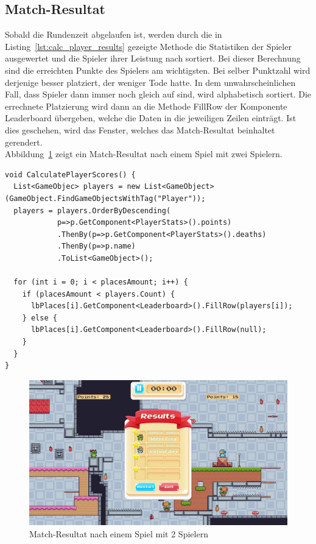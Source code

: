 \subsection{Match-Resultat}
Sobald die Rundenzeit abgelaufen ist, werden durch die in Listing~\ref{lst:calc_player_results} gezeigte Methode die Statistiken der Spieler ausgewertet und die Spieler ihrer Leistung nach sortiert. Bei dieser Berechnung sind die erreichten Punkte des Spielers am wichtigsten. Bei selber Punktzahl wird derjenige besser platziert, der weniger Tode hatte. In dem unwahrscheinlichen Fall, dass Spieler dann immer noch gleich auf sind, wird alphabetisch sortiert. Die errechnete Platzierung wird dann an die Methode FillRow der Komponente Leaderboard übergeben, welche die Daten in die jeweiligen Zeilen einträgt. Ist dies geschehen, wird das Fenster, welches das Match-Resultat beinhaltet gerendert.\\

Abbildung~\ref{fig:match-results} zeigt ein Match-Resultat nach einem Spiel mit zwei Spielern.\\

\begin{lstlisting}[caption={Funktion zur Berechnung der Spielerplatzierungen},captionpos=b,label=lst:calc_player_results]
void CalculatePlayerScores() {
  List<GameObjec> players = new List<GameObject>(GameObject.FindGameObjectsWithTag("Player"));
  players = players.OrderByDescending(
            p=>p.GetComponent<PlayerStats>().points)
            .ThenBy(p=>p.GetComponent<PlayerStats>().deaths)
            .ThenBy(p=>p.name)
            .ToList<GameObject>();
    
  for (int i = 0; i < placesAmount; i++) {
    if (placesAmount < players.Count) {
      lbPlaces[i].GetComponent<Leaderboard>().FillRow(players[i]);
    } else {
      lbPlaces[i].GetComponent<Leaderboard>().FillRow(null);
    }
  }
}
\end{lstlisting}

\begin{figure}[th]
\centering
\includegraphics[width=150mm]{Figures/match-results.jpg}
\decoRule
\caption[Match-Resultat]{Match-Resultat nach einem Spiel mit 2 Spielern}
\label{fig:match-results}
\end{figure}


